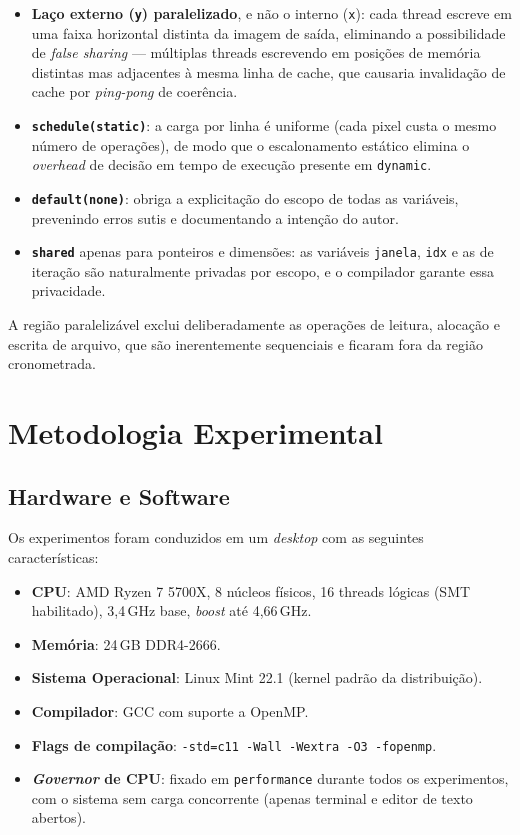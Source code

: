 \documentclass[12pt]{article}
\begin{document}
\begin{itemize}
	\item \textbf{Laço externo (\texttt{y}) paralelizado}, e não o interno (\texttt{x}): cada thread escreve em uma faixa horizontal distinta da imagem de saída, eliminando a possibilidade de \textit{false sharing} — múltiplas threads escrevendo em posições de memória distintas mas adjacentes à mesma linha de cache, que causaria invalidação de cache por \textit{ping-pong} de coerência.
	\item \textbf{\texttt{schedule(static)}}: a carga por linha é uniforme (cada pixel custa o mesmo número de operações), de modo que o escalonamento estático elimina o \textit{overhead} de decisão em tempo de execução presente em \texttt{dynamic}.
	\item \textbf{\texttt{default(none)}}: obriga a explicitação do escopo de todas as variáveis, prevenindo erros sutis e documentando a intenção do autor.
	\item \textbf{\texttt{shared}} apenas para ponteiros e dimensões: as variáveis \texttt{janela}, \texttt{idx} e as de iteração são naturalmente privadas por escopo, e o compilador garante essa privacidade.
\end{itemize}

A região paralelizável exclui deliberadamente as operações de leitura, alocação e escrita de arquivo, que são inerentemente sequenciais e ficaram fora da região cronometrada.

\newpage
\section{Metodologia Experimental}

\subsection{Hardware e Software}

Os experimentos foram conduzidos em um \textit{desktop} com as seguintes características:

\begin{itemize}
	\item \textbf{CPU}: AMD Ryzen 7 5700X, 8 núcleos físicos, 16 threads lógicas (SMT habilitado), 3,4\,GHz base, \textit{boost} até 4,66\,GHz.
	\item \textbf{Memória}: 24\,GB DDR4-2666.
	\item \textbf{Sistema Operacional}: Linux Mint 22.1 (kernel padrão da distribuição).
	\item \textbf{Compilador}: GCC com suporte a OpenMP.
	\item \textbf{Flags de compilação}: \texttt{-std=c11 -Wall -Wextra -O3 -fopenmp}.
	\item \textbf{\textit{Governor} de CPU}: fixado em \texttt{performance} durante todos os experimentos, com o sistema sem carga concorrente (apenas terminal e editor de texto abertos).
\end{itemize}
\end{document}

